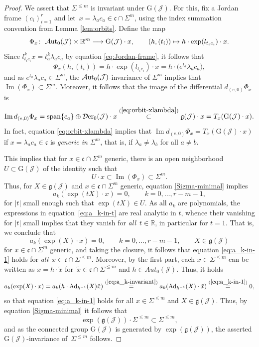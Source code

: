 \documentclass[10pt,a4paper]{amsart}
\numberwithin{equation}{section}
\newcommand{\be}{\begin{equation}}
\newcommand{\ee}{\end{equation}}
\newcommand{\Aut}{\mathcal{A}{\rm ut}}
\newcommand{\Der}{\mathcal{D}{\rm er}}
\newcommand{\Jcal}{\mathcal{J}}
\newcommand{\G}{\mathrm{G}}
\newcommand{\R}{{\mathbb R}}
\newcommand{\g}{{\mathfrak{g}}}
\newcommand{\cf}{{\mathfrak c}}
\newcommand{\sspan}{{\mathrm{span}}}
\begin{document}
\begin{proof}
We assert that $\Sigma^{\leq m}$ is invariant under $\G(\Jcal)$. For this, fix a Jordan frame $(c_i)_{i=1}^r$ and let~$x = \lambda_a c_a \in \cf \cap \Sigma^m$, using the index summation convention from Lemma \ref{lem:orbits}. Define the map
\[
\Phi_x\colon\ \Aut_0(\Jcal) \times \R^m \longrightarrow \G(\Jcal) \cdot x, \qquad (h, (t_i)) \mapsto h \cdot \exp(l_{t_i c_i}) \cdot x.
\]
Since $l_{t_i c_i}^k x = t_a^k \lambda_a c_a$ by equation \eqref{eq:Jordan-frame}, it follows that
\be \label{eq:action-diag}
\Phi_x(h, (t_i)) = h \cdot \exp(l_{t_i c_i}) \cdot x = h \cdot \big(e^{t_a} \lambda_a c_a\big),
\ee
and as $e^{t_a} \lambda_a c_a \in \Sigma^m$, the $\Aut_0(\Jcal)$-invariance of $\Sigma^m$ implies that $\operatorname{Im}(\Phi_x) \subset \Sigma^m$. Moreover, it follows that the image of the differential $d_{(e,0)} \Phi_x$ is
\[ %
\operatorname{Im} d_{(e,0)} \Phi_x = \sspan\{c_a\} \oplus \Der_0(\Jcal) \cdot x \stackrel{(\ref{eq:orbit-xlambda})}\subset \g(\Jcal) \cdot x = T_x(\G(\Jcal) \cdot x).
\]
In fact, equation \eqref{eq:orbit-xlambda} implies that $\operatorname{Im} d_{(e,0)} \Phi_x = T_x(\G(\Jcal) \cdot x)$ if $x = \lambda_a c_a \in \cf$ is {\em generic in $\Sigma^m$}, that is, if $\lambda_a \neq \lambda_b$ for all $a \neq b$.

This implies that for $x \in \cf \cap \Sigma^m$ generic, there is an open neighborhood $U \subset \G(\Jcal)$ of the identity such that
\[ %
U \cdot x \subset \operatorname{Im}(\Phi_x) \subset \Sigma^m.
\]
Thus, for $X \in \g(\Jcal)$ and $x \in \cf \cap \Sigma^m$ generic, equation \eqref{Sigma-minimal} implies
\be \label{eq:a_k-in-t}
a_k(\exp(tX) \cdot x) = 0, \qquad k = 0, \dots, r-m-1,
\ee
for $|t|$ small enough such that $\exp(tX) \in U$. As all $a_k$ are polynomials, the expressions in equation~\eqref{eq:a_k-in-t} are real analytic in $t$, whence their vanishing for $|t|$ small implies that they vanish for {\em all}~$t \in \R$, in particular for $t=1$. That is, we conclude that
\be \label{eq:a_k-in-1}
a_k(\exp(X) \cdot x) = 0, \qquad k = 0, \dots, r-m-1, \qquad X \in \g(\Jcal)
\ee
for $x \in \cf \cap \Sigma^m$ generic, and taking the closure, it follows that equation \eqref{eq:a_k-in-1} holds for {\em all}~${x \in \cf \cap \Sigma^{\leq m}}$.
Moreover, by the first part, each $x \in \Sigma^{\leq m}$ can be written as $x = h \cdot \tilde x$ for~$\tilde x \in \cf \cap \Sigma^{\leq m}$ and $h \in Aut_0(\Jcal)$. Thus, it holds
\[
a_k(\exp(X) \cdot x) = a_k( h \cdot \operatorname{Ad}_{h^{-1}}(X) \tilde x) \stackrel{(\ref{eq:a_k-invariant})}= a_k(\operatorname{Ad}_{h^{-1}}(X) \cdot \tilde x) \stackrel{(\ref{eq:a_k-in-1})} = 0,
\]
so that equation \eqref{eq:a_k-in-1} holds for all $x \in \Sigma^{\leq m}$ and $X \in \g(\Jcal)$.
Thus, by equation \eqref{Sigma-minimal} it follows that
\[
\exp(\g(\Jcal)) \cdot \Sigma^{\leq m} \subset \Sigma^{\leq m},
\]
and as the connected group $\G(\Jcal)$ is generated by $\exp(\g(\Jcal))$, the asserted $\G(\Jcal)$-invariance of~$\Sigma^{\leq m}$ follows.


\end{proof}
\end{document}
